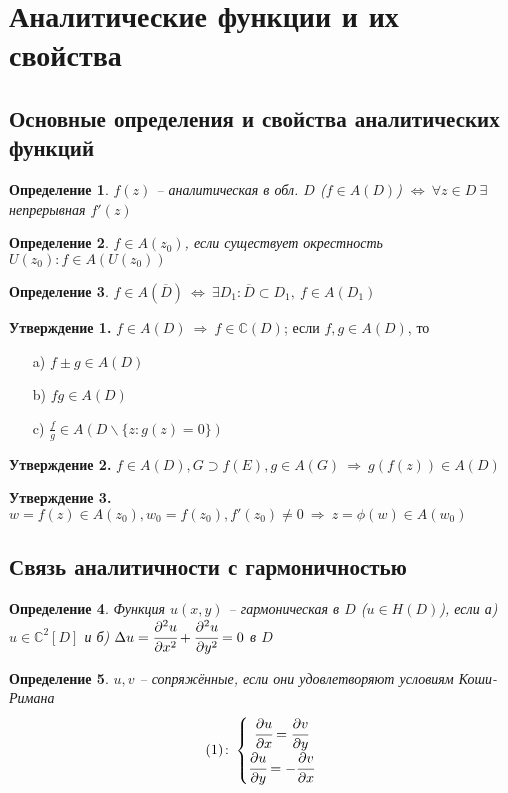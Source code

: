 \documentclass[final]{report}
\newcommand{\dd}{\partial}
\newcommand{\then}{\ \Rightarrow\ }
\renewcommand{\C}{\mathbb{C}}
\newcommand{\LRA}{\Leftrightarrow}
\renewcommand{\bar}{\overline}
\renewcommand{\f}{\phi}
\newcommand{\D}{\Delta}
\newcommand{\z}{\bar{z}}
\newcommand{\sys}[1]{\left\{\begin{matrix}#1\end{matrix}\right.}
\newcommand{\opr}[1]{\begin{opred}#1\end{opred}}
\newtheorem*{opred}{Определение}
\theoremstyle{remark}
\begin{document}
%
%


\section{Аналитические функции и их свойства}

\subsection{Основные определения и свойства аналитических функций}

\opr{$f(z)$ -- аналитическая в обл. $D$ ($f\in A(D)$) $\LRA\ \forall z\in D\ \exists$ непрерывная $f'(z)$ }
\opr{$f\in A(z_0)$, если существует окрестность $U(z_0)\colon f\in A(U(z_0))$}
\opr{$f\in A(\bar{D})\ \LRA\ \exists D_1\colon \bar{D}\subset D_1,\ f\in A(D_1)$}

{\bfseries Утверждение 1.} 
$f\in A(D)\then f\in \C(D)$; 
если $f,g\in A(D)$, то
\begin{itemize}
\item[a)] $f\pm g\in A(D)$
\item[b)] $fg \in A(D)$
\item[c)] $\frac fg \in A(D\smallsetminus\{z\colon g(z)=0\})$
\end{itemize}

{\bfseries Утверждение 2.} 
$f\in A(D), G\supset f(E), g\in A(G)\then g(f(z))\in A(D)$

{\bfseries Утверждение 3.} 
$w=f(z)\in A(z_0), w_0=f(z_0), f'(z_0)\neq 0 \then z=\f(w)\in A(w_0)$

\subsection{Связь аналитичности с гармоничностью}

\opr{Функция $u(x,y)$ -- гармоническая в $D$ ($u\in H(D)$), если а) $u\in\C^2[D]$ и б) $\D u=\cfrac{\dd^2u}{\dd x^2}+\cfrac{\dd^2u}{\dd y^2}=0$ в $D$}

\opr{$u,v$ -- сопряжённые, если они удовлетворяют условиям Коши-Римана $$(1)\colon\sys{\cfrac{\dd u}{\dd x}=\cfrac{\dd v}{\dd y} \\ \cfrac{\dd u}{\dd y}=-\cfrac{\dd v}{\dd x}}$$}
\end{document}
